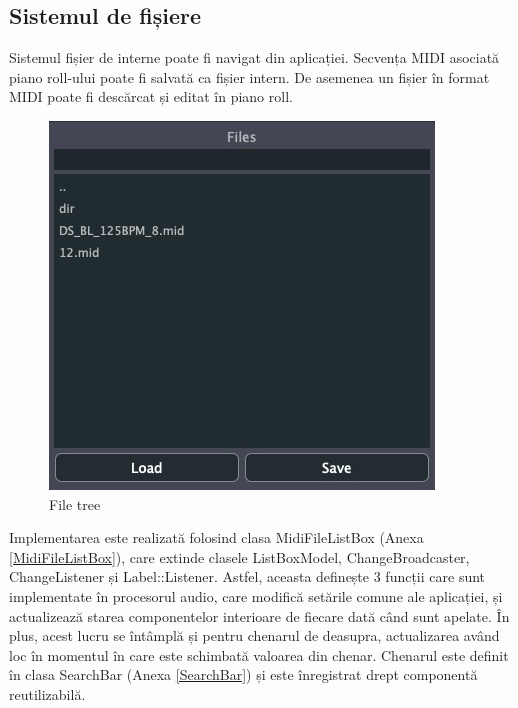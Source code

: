     \subsection{Sistemul de fișiere}
        \noindent Sistemul fișier de interne poate fi navigat din aplicației. Secvența MIDI asociată piano roll-ului poate fi salvată ca fișier intern. De asemenea un fișier în format MIDI poate fi descărcat și editat în piano roll.
        \begin{figure}[H]
            \centering
            \includegraphics[scale=0.5]{images/files.jpeg}
            \caption{File tree}
            \label{fig:files}
        \end{figure}
        \noindent Implementarea este realizată folosind clasa MidiFileListBox (Anexa \ref{MidiFileListBox}), care extinde clasele ListBoxModel, ChangeBroadcaster, ChangeListener și Label::Listener. Astfel, aceasta definește 3 funcții care sunt implementate în procesorul audio, care modifică setările comune ale aplicației, și actualizează starea componentelor interioare de fiecare dată când sunt apelate. În plus, acest lucru se întâmplă și pentru chenarul de deasupra, actualizarea având loc în momentul în care este schimbată valoarea din chenar. Chenarul este definit în clasa SearchBar (Anexa \ref{SearchBar}) și este înregistrat drept componentă reutilizabilă.
